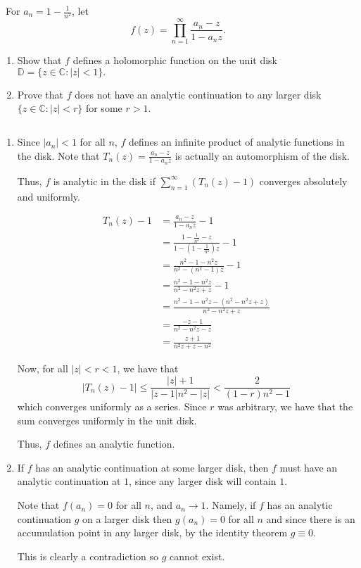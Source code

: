 \documentclass[12pt]{Qual}
\begin{document}
\begin{problem} $\,$
For $a_n=1-\frac{1}{n^2}$, let $$f(z)=\prod_{n=1}^\infty\frac{a_n-z}{1-a_nz}.$$
\begin{enumerate}[label=(\alph*)]
    \item Show that $f$ defines a holomorphic function on the unit disk $\mathbb{D}=\{z\in\mathbb{C}:|z|<1\}.$
    \item Prove that $f$ does not have an analytic continuation to any larger disk $\{z\in\mathbb{C}:|z|<r\}$ for some $r>1$.
\end{enumerate}
\end{problem}


\begin{solution}$\,$
\begin{enumerate}[label=(\alph*)]
    \item Since $|a_n|<1$ for all $n$, $f$ defines an infinite product of analytic functions in the disk. Note that $T_n(z)=\frac{a_n-z}{1-a_nz}$ is actually an automorphism of the disk.

    Thus, $f$ is analytic in the disk if $\sum_{n=1}^\infty(T_n(z)-1)$ converges absolutely and uniformly.

    \begin{align*}
        T_n(z)-1&=\frac{a_n-z}{1-a_nz}-1\\
        &=\frac{1-\frac{1}{n^2}-z}{1-(1-\frac{1}{n^2})z}-1\\
        &=\frac{n^2-1-n^2z}{n^2-(n^2-1)z}-1\\
        &=\frac{n^2-1-n^2z}{n^2-n^2z+z}-1\\
        &=\frac{n^2-1-n^2z-(n^2-n^2z+z)}{n^2-n^2z+z}\\
        &=\frac{-z-1}{n^2-n^2z-z}\\
        &=\frac{z+1}{n^2z+z-n^2}
    \end{align*}

    Now, for all $|z|<r<1$, we have that $$|T_n(z)-1|\le \frac{|z|+1}{|z-1|n^2-|z|}<\frac{2}{(1-r)n^2-1}$$ which converges uniformly as a series. Since $r$ was arbitrary, we have that the sum converges uniformly in the unit disk.

    Thus, $f$ defines an analytic function.
    \item If $f$ has an analytic continuation at some larger disk, then $f$ must have an analytic continuation at $1$, since any larger disk will contain $1$.

    Note that $f(a_n)=0$ for all $n$, and $a_n\to 1$. Namely, if $f$ has an analytic continuation $g$ on a larger disk then $g(a_n)=0$ for all $n$ and since there is an accumulation point in any larger disk, by the identity theorem $g\equiv 0$.

    This is clearly a contradiction so $g$ cannot exist.
\end{enumerate}
\end{solution}
\end{document}
